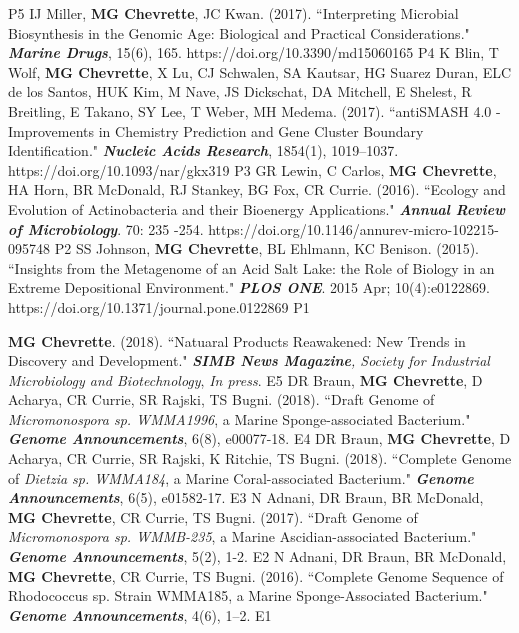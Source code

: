 \begin{cvpubs}
{    } %
    {P5} %
  \cvpub
    {IJ Miller, \textbf{MG Chevrette}, JC Kwan. (2017). ``Interpreting Microbial Biosynthesis in the Genomic Age: Biological and Practical Considerations." \textit{\textbf{Marine Drugs}}, 15(6), 165. https://doi.org/10.3390/md15060165
    } %
    {P4} %
  \cvpub
    {K Blin, T Wolf, \textbf{MG Chevrette}, X Lu, CJ Schwalen, SA Kautsar, HG Suarez Duran, ELC de los Santos, HUK Kim, M Nave, JS Dickschat, DA Mitchell, E Shelest, R Breitling, E Takano, SY Lee, T Weber, MH Medema. (2017). ``antiSMASH 4.0 - Improvements in Chemistry Prediction and Gene Cluster Boundary Identification." \textit{\textbf{Nucleic Acids Research}}, 1854(1), 1019–1037. https://doi.org/10.1093/nar/gkx319
    }  %
    {P3} %
  \cvpub
    {GR Lewin, C Carlos, \textbf{MG Chevrette}, HA Horn, BR McDonald, RJ Stankey, BG Fox, CR Currie. (2016). ``Ecology and Evolution of Actinobacteria and their Bioenergy Applications." \textit{\textbf{Annual Review of Microbiology}}. 70: 235 -254. https://doi.org/10.1146/annurev-micro-102215-095748
    } %
    {P2} %
  \cvpub
    {SS Johnson, \textbf{MG Chevrette}, BL Ehlmann, KC Benison. (2015). ``Insights from the Metagenome of an Acid Salt Lake: the Role of Biology in an Extreme Depositional Environment."  \textit{\textbf{PLOS ONE}}. 2015 Apr; 10(4):e0122869. https://doi.org/10.1371/journal.pone.0122869
    } %
    {P1} %
\end{cvpubs}

\begin{cvpubs}
  \cvpub
    {\textbf{MG Chevrette}. (2018). ``Natuaral Products Reawakened: New Trends in Discovery and Development." \textit{\textbf{SIMB News Magazine}, Society for Industrial Microbiology and Biotechnology}, \textit{In press}. }  %
    {E5} %
  \cvpub
    {DR Braun, \textbf{MG Chevrette}, D Acharya, CR Currie, SR Rajski, TS Bugni. (2018). ``Draft Genome of \textit{Micromonospora sp. WMMA1996}, a Marine Sponge-associated Bacterium." \textit{\textbf{Genome Announcements}}, 6(8), e00077-18.}  %
    {E4} %
  \cvpub
    {DR Braun, \textbf{MG Chevrette}, D Acharya, CR Currie, SR Rajski, K Ritchie, TS Bugni. (2018). ``Complete Genome of \textit{Dietzia sp. WMMA184}, a Marine Coral-associated Bacterium." \textit{\textbf{Genome Announcements}}, 6(5), e01582-17.} %
    {E3} %
  \cvpub
    {N Adnani, DR Braun, BR McDonald, \textbf{MG Chevrette}, CR Currie, TS Bugni. (2017). ``Draft Genome of \textit{Micromonospora sp. WMMB-235}, a Marine Ascidian-associated Bacterium." \textit{\textbf{Genome Announcements}}, 5(2), 1-2.} %
    {E2} %
  \cvpub
  {N Adnani, DR Braun, BR McDonald, \textbf{MG Chevrette}, CR Currie, TS Bugni. (2016). ``Complete Genome Sequence of Rhodococcus sp. Strain WMMA185, a Marine Sponge-Associated Bacterium." \textit{\textbf{Genome Announcements}}, 4(6), 1–2.} %
    {E1} %
\end{cvpubs}
